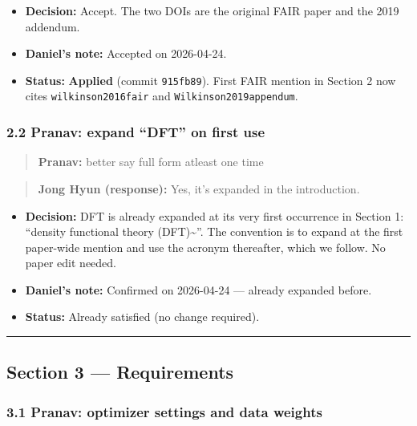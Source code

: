 \begin{itemize}
\tightlist
\item
  \textbf{Decision:} Accept. The two DOIs are the original FAIR paper and the 2019 addendum.
\item
  \textbf{Daniel's note:} Accepted on 2026-04-24.
\item
  \textbf{Status:} {\color{green!60!black}\faCheckCircle} \textbf{Applied} (commit \texttt{915fb89}). First FAIR mention in Section 2 now cites \texttt{wilkinson2016fair} and \texttt{Wilkinson2019appendum}.
\end{itemize}

\subsubsection{2.2 Pranav: expand ``DFT'' on first use}\label{pranav-expand-dft-on-first-use}

\begin{quote}
\textbf{Pranav:} better say full form atleast one time
\end{quote}

\begin{quote}
\textbf{Jong Hyun (response):} Yes, it's expanded in the introduction.
\end{quote}

\begin{itemize}
\tightlist
\item
  \textbf{Decision:} DFT is already expanded at its very first occurrence in Section 1: ``density functional theory (DFT)\textasciitilde{}\cite{kohn1965dft}''. The convention is to expand at the first paper-wide mention and use the acronym thereafter, which we follow. No paper edit needed.
\item
  \textbf{Daniel's note:} Confirmed on 2026-04-24 --- already expanded before.
\item
  \textbf{Status:} {\color{green!60!black}\faCheckCircle} Already satisfied (no change required).
\end{itemize}

\begin{center}\rule{0.5\linewidth}{0.5pt}\end{center}

\subsection{Section 3 --- Requirements}\label{section-3-requirements}

\subsubsection{3.1 Pranav: optimizer settings and data weights}\label{pranav-optimizer-settings-and-data-weights}

